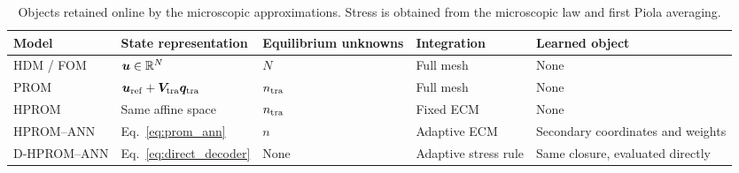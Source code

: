 \begin{table}[htbp]
 \centering\small
 \caption{Objects retained online by the microscopic approximations. Stress is obtained from the microscopic law and first Piola averaging.}
 \label{tab:reduction_levels}
 \begin{tabularx}{\linewidth}{lYYYY}
 \toprule
 Model & State representation & Equilibrium unknowns & Integration & Learned object\\
 \midrule
 HDM / FOM & $\bm u\in\mathbb R^N$ & $N$ & Full mesh & None\\
 PROM & $\bm u_{\rm ref}+\bm V_{\rm tra}\bm q_{\rm tra}$ & $n_{\rm tra}$ & Full mesh & None\\
 HPROM & Same affine space & $n_{\rm tra}$ & Fixed ECM & None\\
 HPROM--ANN & Eq.~\eqref{eq:prom_ann} & $n$ & Adaptive ECM & Secondary coordinates and weights\\
 D-HPROM--ANN & Eq.~\eqref{eq:direct_decoder} & None & Adaptive stress rule & Same closure, evaluated directly\\
 \bottomrule
 \end{tabularx}
\end{table}

